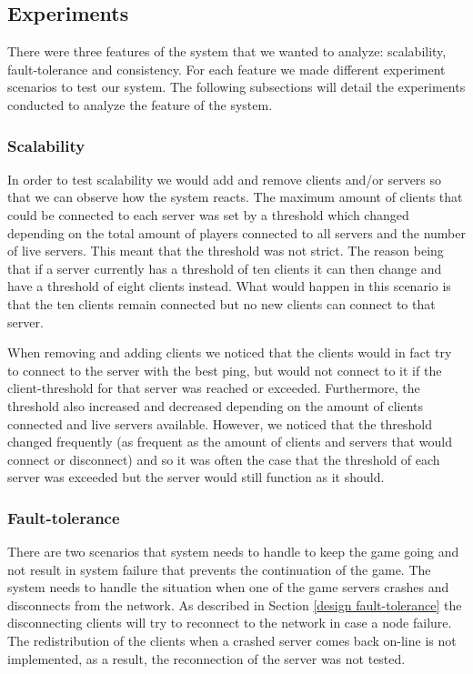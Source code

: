 \documentclass[a4paper]{article}
\begin{document}
\subsection{Experiments}
There were three features of the system that we wanted to analyze: scalability, fault-tolerance and consistency. For each feature we made different experiment scenarios to test our system. The following subsections will detail the experiments conducted to analyze the feature of the system.

\subsubsection{Scalability}
In order to test scalability we would add and remove clients and/or servers so that we can observe how the system reacts. The maximum amount of clients that could be connected to each server was set by a threshold which changed depending on the total amount of players connected to all servers and the number of live servers. This meant that the threshold was not strict. The reason being that if a server currently has a threshold of ten clients it can then change and have a threshold of eight clients instead. What would happen in this scenario is that the ten clients remain connected but no new clients can connect to that server. 

When removing and adding clients we noticed that the clients would in fact try to connect to the server with the best ping, but would not connect to it if the client-threshold for that server was reached or exceeded. Furthermore, the threshold also increased and decreased depending on the amount of clients connected and live servers available. However, we noticed that the threshold changed frequently (as frequent as the amount of clients and servers that would connect or disconnect) and so it was often the case that the threshold of each server was exceeded but the server would still function as it should. 

\subsubsection{Fault-tolerance}
There are two scenarios that system needs to handle to keep the game going and not result in system failure that prevents the continuation of the game. The system needs to handle the situation when one of the game servers crashes and disconnects from the network. As described in Section \ref{design fault-tolerance} the disconnecting clients will try to reconnect to the network in case a node failure. The redistribution of the clients when a crashed server comes back on-line is not implemented, as a result, the reconnection of the server was not tested.
\end{document}
